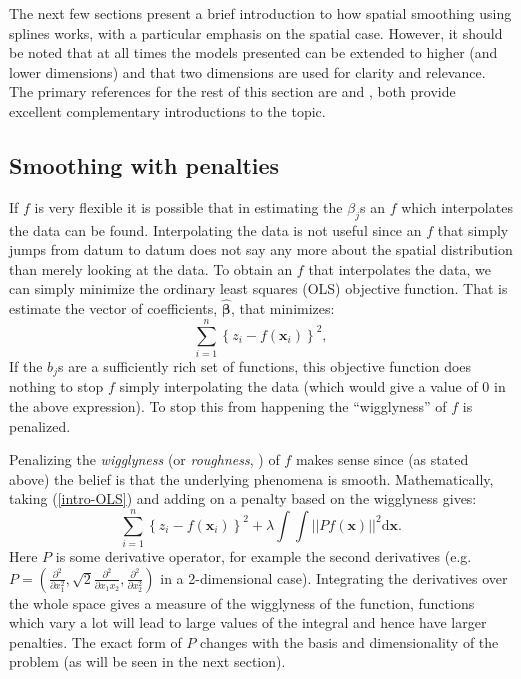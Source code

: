 The next few sections present a brief introduction to how spatial smoothing using splines works, with a particular emphasis on the spatial case. However, it should be noted that at all times the models presented can be extended to higher (and lower dimensions) and that two dimensions are used for clarity and relevance. The primary references for the rest of this section are  and , both provide excellent complementary introductions to the topic.

\subsection{Smoothing with penalties}
\label{GAMpenalties}

If $f$ is very flexible it is possible that in estimating the $\beta_j$s an $f$ which interpolates the data can be found. Interpolating the data is not useful since an $f$ that simply jumps from datum to datum does not say any more about the spatial distribution than merely looking at the data. To obtain an $f$ that interpolates the data, we can simply minimize the ordinary least squares (OLS) objective function. That is estimate the vector of coefficients, $\hat{\bm{\beta}}$, that minimizes:
\begin{equation}
\sum_{i=1}^n \left \{ z_i - f(\mathbf{x}_i) \right \}^2,
\label{intro-OLS}
\end{equation}
If the $b_j$s are a sufficiently rich set of functions, this objective function does nothing to stop $f$ simply interpolating the data (which would give a value of 0 in the above expression). To stop this from happening the ``wigglyness'' of $f$ is penalized.

Penalizing the \textit{wigglyness} (or \textit{roughness}, \cite{rwc}) of $f$ makes sense since (as stated above) the belief is that the underlying phenomena is smooth. Mathematically, taking (\ref{intro-OLS}) and adding on a penalty based on the wigglyness gives:
\begin{equation}
\sum_{i=1}^n \left \{ z_i - f(\mathbf{x}_i) \right \}^2 +  \lambda \int\int \lvert \lvert P f(\mathbf{x}) \rvert \rvert^2 \text{d}\mathbf{x}.
\label{intro-2d-objfcn}
\end{equation}
Here $P$ is some derivative operator, for example the second derivatives (e.g. $P=\left ( \frac{\partial^2}{\partial x_1^2}, \sqrt{2} \frac{\partial^2}{\partial x_1 x_2}, \frac{\partial^2}{\partial x_2^2}\right )$ in a 2-dimensional case). Integrating the derivatives over the whole space gives a measure of the wigglyness of the function, functions which vary a lot will lead to large values of the integral and hence have larger penalties. The exact form of $P$ changes with the basis and dimensionality of the problem (as will be seen in the next section).

